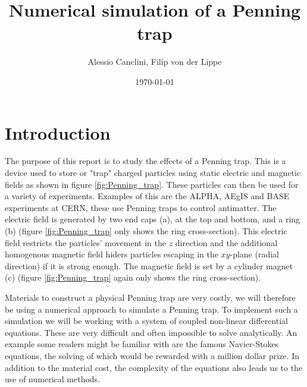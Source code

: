 \documentclass[english,notitlepage,reprint,nofootinbib]{revtex4-1}  %
\begin{document}
\title{Numerical simulation of a Penning trap}  %
\author{Alessio Canclini, Filip von der Lippe} %
\date{\today}                             %
\noaffiliation                            %

\begin{abstract}
\end{abstract}
\maketitle


\section{Introduction}
The purpose of this report is to study the effects of a Penning trap. This is a device used to store or "trap" charged particles 
using static electric and magnetic fields as shown in figure \ref*{fig:Penning_trap}. These particles can then be used for a variety of experiments. Examples of this are the ALPHA, AEgIS and BASE 
experiments at CERN, these use Penning traps to control antimatter. 
The electric field is generated by two end caps (a), at the top and bottom, 
and a ring (b) (figure \ref*{fig:Penning_trap} only shows the ring cross-section).
This electric field restricts the particles' movement in the $z$ direction and the additional homogenous magnetic field 
hiders particles escaping in the $xy$-plane (radial direction) if it is strong enough. The magnetic field is set by 
a cylinder magnet (c) (figure \ref*{fig:Penning_trap} again only shows the ring cross-section). 

Materials to construct a physical Penning trap are very costly, we will therefore
be using a numerical approach to simulate a Penning trap. To implement such a simulation
we will be working with a system of coupled non-linear differential equations. These are very
difficult and often impossible to solve analytically. An example some readers might be familiar with are the famous
Navier-Stokes equations, the solving of which would be rewarded with a million dollar prize. In addition to the
material cost, the complexity of the equations also leads us to the use of numerical methods.
\end{document}
